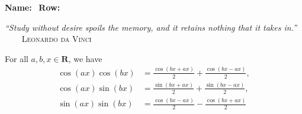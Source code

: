 \documentclass[12pt,fleqn]{exam}
\begin{document}
\newcommand{\reals}{\mathbf{R}}
\newcommand{\bi}{\mathbf{i}}
\newcommand{\bj}{\mathbf{j}}
\newcommand{\bk}{mathbf{k}}

\newcommand{\euler}{\mathrm{e}}
\newcommand{\ex}{1}
\newenvironment{alphalist}{
  \begin{enumerate}[(a)]
    \addtolength{\itemsep}{-1.0\itemsep}}
  {\end{enumerate}}

\newenvironment{handlist}{
  \begin{enumerate}[\leftthumbsup]
    \addtolength{\itemsep}{-1.0\itemsep}}
  {\end{enumerate}}


\vspace{0.1in}
\noindent{}
{\bf Name:}\hrulefill\
\noindent {}
{\bf Row:}\hrulefill\


\noindent \emph{“Study without desire spoils the memory, and it retains nothing that it takes in.”} \\ 
$\phantom{xxx}$ \hfill  \textsc{Leonardo da Vinci}

For all $a,b,x \in \reals$, we have 
\begin{align*}
\cos{\left( a x\right) } \cos{\left( b x\right) } & =\frac{\cos{\left( b x+a x\right) }}{2}+\frac{\cos{\left( b x-a x\right) }}{2},\\
\cos{\left( a x\right) } \sin{\left( b x\right) }&=\frac{\sin{\left( b x+a x\right) }}{2}+\frac{\sin{\left( b x-a x\right) }}{2}, \\
\sin{\left( a x\right) } \sin{\left( b x\right) } & =\frac{\cos{\left( b x-a x\right) }}{2}-\frac{\cos{\left( b x+a x\right) }}{2}
\end{align*}
\end{document}
